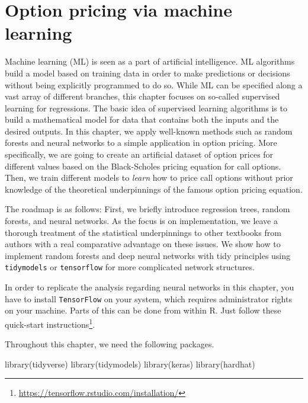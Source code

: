 \documentclass[
]{book}
\newenvironment{Shaded}{\begin{snugshade}}{\end{snugshade}}
\newcommand{\FunctionTok}[1]{\textcolor[rgb]{0,0,0}{#1}}
\newcommand{\NormalTok}[1]{#1}
\renewcommand{\href}[2]{#2\footnote{\url{#1}}}
\begin{document}
\hypertarget{option-pricing-via-machine-learning}{%
\chapter{Option pricing via machine learning}\label{option-pricing-via-machine-learning}}

Machine learning (ML) is seen as a part of artificial intelligence.
ML algorithms build a model based on training data in order to make predictions or decisions without being explicitly programmed to do so.
While ML can be specified along a vast array of different branches, this chapter focuses on so-called supervised learning for regressions. The basic idea of supervised learning algorithms is to build a mathematical model for data that contains both the inputs and the desired outputs. In this chapter, we apply well-known methods such as random forests and neural networks to a simple application in option pricing. More specifically, we are going to create an artificial dataset of option prices for different values based on the Black-Scholes pricing equation for call options. Then, we train different models to \emph{learn} how to price call options without prior knowledge of the theoretical underpinnings of the famous option pricing equation.

The roadmap is as follows: First, we briefly introduce regression trees, random forests, and neural networks. As the focus is on implementation, we leave a thorough treatment of the statistical underpinnings to other textbooks from authors with a real comparative advantage on these issues.
We show how to implement random forests and deep neural networks with tidy principles using \texttt{tidymodels} or \texttt{tensorflow} for more complicated network structures.

In order to replicate the analysis regarding neural networks in this chapter, you have to install \texttt{TensorFlow} on your system, which requires administrator rights on your machine. Parts of this can be done from within R. Just follow \href{https://tensorflow.rstudio.com/installation/}{these quick-start instructions}.

Throughout this chapter, we need the following packages.

\begin{Shaded}
\begin{Highlighting}[]
\FunctionTok{library}\NormalTok{(tidyverse)}
\FunctionTok{library}\NormalTok{(tidymodels)}
\FunctionTok{library}\NormalTok{(keras)}
\FunctionTok{library}\NormalTok{(hardhat)}
\end{Highlighting}
\end{Shaded}
\end{document}
